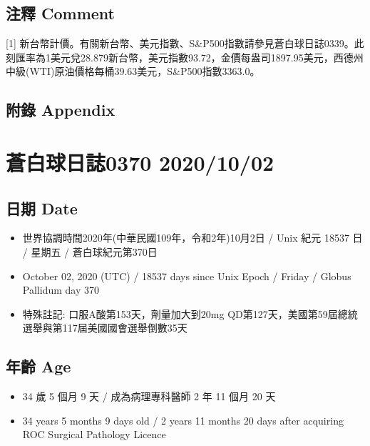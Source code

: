 \documentclass[
]{article}
\providecommand{\tightlist}{%
  \setlength{\itemsep}{0pt}\setlength{\parskip}{0pt}}
\begin{document}
\hypertarget{ux6ce8ux91cb-comment}{%
\subsection{注釋 Comment}\label{ux6ce8ux91cb-comment}}

{[}1{]}
新台幣計價。有關新台幣、美元指數、S\&P500指數請參見蒼白球日誌0339。此刻匯率為1美元兌28.879新台幣，美元指數93.72，金價每盎司1897.95美元，西德州中級(WTI)原油價格每桶39.63美元，S\&P500指數3363.0。

\hypertarget{ux9644ux9304-appendix}{%
\subsection{附錄 Appendix}\label{ux9644ux9304-appendix}}

\hypertarget{ux84bcux767dux7403ux65e5ux8a8c0370-20201002}{%
\section{蒼白球日誌0370
2020/10/02}\label{ux84bcux767dux7403ux65e5ux8a8c0370-20201002}}

\hypertarget{ux65e5ux671f-date-1}{%
\subsection{日期 Date}\label{ux65e5ux671f-date-1}}

\begin{itemize}
\tightlist
\item
  世界協調時間2020年(中華民國109年，令和2年)10月2日 / Unix 紀元 18537 日
  / 星期五 / 蒼白球紀元第370日
\item
  October 02, 2020 (UTC) / 18537 days since Unix Epoch / Friday / Globus
  Pallidum day 370
\item
  特殊註記: 口服A酸第153天，劑量加大到20mg
  QD第127天，美國第59屆總統選舉與第117屆美國國會選舉倒數35天
\end{itemize}

\hypertarget{ux5e74ux9f61-age-1}{%
\subsection{年齡 Age}\label{ux5e74ux9f61-age-1}}

\begin{itemize}
\tightlist
\item
  34 歲 5 個月 9 天 / 成為病理專科醫師 2 年 11 個月 20 天
\item
  34 years 5 months 9 days old / 2 years 11 months 20 days after
  acquiring ROC Surgical Pathology Licence
\end{itemize}
\end{document}
